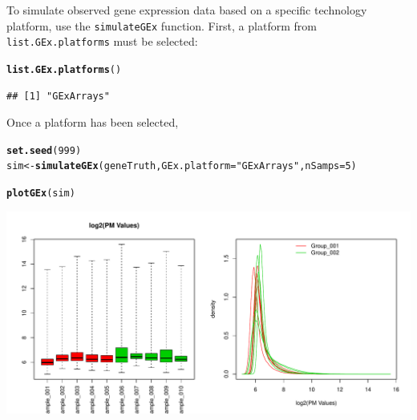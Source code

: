 \documentclass{article}\usepackage[]{graphicx}\usepackage[usenames,dvipsnames]{color}
\makeatletter
\def\maxwidth{ %
  \ifdim\Gin@nat@width>\linewidth
    \linewidth
  \else
    \Gin@nat@width
  \fi
}
\newcommand{\hlnum}[1]{\textcolor[rgb]{0.686,0.059,0.569}{#1}}%
\newcommand{\hlstr}[1]{\textcolor[rgb]{0.192,0.494,0.8}{#1}}%
\newcommand{\hlstd}[1]{\textcolor[rgb]{0.345,0.345,0.345}{#1}}%
\newcommand{\hlkwb}[1]{\textcolor[rgb]{0.69,0.353,0.396}{#1}}%
\newcommand{\hlkwc}[1]{\textcolor[rgb]{0.333,0.667,0.333}{#1}}%
\newcommand{\hlkwd}[1]{\textcolor[rgb]{0.737,0.353,0.396}{\textbf{#1}}}%
\newenvironment{kframe}{%
 \def\at@end@of@kframe{}%
 \ifinner\ifhmode%
  \def\at@end@of@kframe{\end{minipage}}%
  \begin{minipage}{\columnwidth}%
 \fi\fi%
 \def\FrameCommand##1{\hskip\@totalleftmargin \hskip-\fboxsep
 \colorbox{shadecolor}{##1}\hskip-\fboxsep
     \hskip-\linewidth \hskip-\@totalleftmargin \hskip\columnwidth}%
 \MakeFramed {\advance\hsize-\width
   \@totalleftmargin\z@ \linewidth\hsize
   \@setminipage}}%
 {\par\unskip\endMakeFramed%
 \at@end@of@kframe}
\newenvironment{knitrout}{}{} %
\makeatother
\begin{document}
To simulate observed gene expression data based on a specific technology 
platform, use the \texttt{simulateGEx} function. First, a platform from 
\texttt{list.GEx.platforms} must be selected:
\begin{knitrout}
\color{fgcolor}\begin{kframe}
\begin{alltt}
\hlkwd{list.GEx.platforms}\hlstd{()}
\end{alltt}
\begin{verbatim}
## [1] "GExArrays"
\end{verbatim}
\end{kframe}
\end{knitrout}

Once a platform has been selected, 
\begin{knitrout}
\color{fgcolor}\begin{kframe}
\begin{alltt}
\hlkwd{set.seed}\hlstd{(}\hlnum{999}\hlstd{)}
\hlstd{sim} \hlkwb{<-} \hlkwd{simulateGEx}\hlstd{(geneTruth,}  \hlkwc{GEx.platform} \hlstd{=} \hlstr{"GExArrays"}\hlstd{,} \hlkwc{nSamps} \hlstd{=} \hlnum{5}\hlstd{)}
\end{alltt}


{\ttfamily\noindent\itshape\color{messagecolor}{\#\# Simulating gene expression samples using the GEx.platform: GExArrays\\\#\# No PCR amplification of RNA transcript counts.}}\begin{alltt}
\hlkwd{plotGEx}\hlstd{(sim)}
\end{alltt}
\end{kframe}
\includegraphics[width=\maxwidth]{figure/gene-figs-1} 

\end{knitrout}
\end{document}
